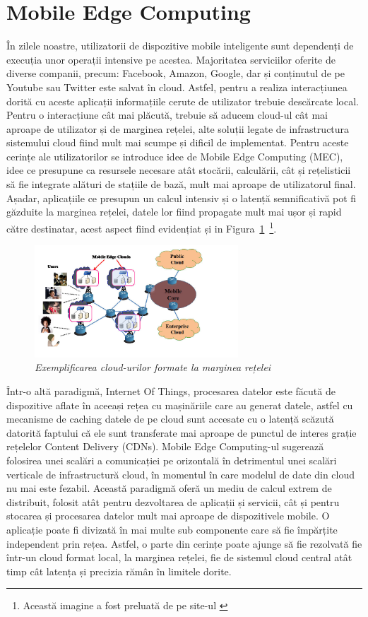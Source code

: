 \documentclass[12pt,a4paper]{report}
\begin{document}
\section{Mobile Edge Computing}
În zilele noastre, utilizatorii de dispozitive mobile inteligente sunt dependenți de execuția unor operații intensive pe acestea. Majoritatea serviciilor oferite de diverse companii, precum: Facebook, Amazon, Google, dar și conținutul de pe Youtube sau Twitter este salvat în cloud. Astfel, pentru a realiza interacțiunea dorită cu aceste aplicații informațiile cerute de utilizator trebuie descărcate local. Pentru o interacțiune cât mai plăcută, trebuie să aducem cloud-ul cât mai aproape de utilizator și de marginea rețelei, alte soluții legate de infrastructura sistemului cloud fiind mult mai scumpe și dificil de implementat. Pentru aceste cerințe ale utilizatorilor se introduce idee de Mobile Edge Computing (MEC), idee ce presupune ca resursele necesare atât stocării, calculării, cât și rețelisticii să fie integrate alături de stațiile de bază, mult mai aproape de utilizatorul final. Așadar, aplicațiile ce presupun un calcul intensiv și o latență semnificativă pot fi găzduite la marginea rețelei, datele lor fiind propagate mult mai ușor și rapid către destinatar, acest aspect fiind evidențiat și in Figura~\ref{fig:pic0}~\footnote{Această imagine a fost preluată de pe site-ul \cite{MECPicture} }.
\begin{figure}[th]
\centering
\includegraphics[width=3in]{pics/mobile-edge-computing.jpg}
  \caption{\emph{Exemplificarea cloud-urilor formate la marginea rețelei}}
  \label{fig:pic0}
\end{figure}

Într-o altă paradigmă, Internet Of Things, procesarea datelor este făcută de dispozitive aflate în aceeași rețea cu mașinăriile care au generat datele, astfel cu mecanisme de caching datele de pe cloud sunt accesate cu o latență scăzută datorită faptului că ele sunt transferate mai aproape de punctul de interes grație rețelelor Content Delivery (CDNs). Mobile Edge Computing-ul\cite{MecSurvey} sugerează folosirea unei scalări a comunicației pe orizontală în detrimentul unei scalări verticale de infrastructură cloud, în momentul în care modelul de date din cloud nu mai este fezabil. Această paradigmă oferă un mediu de calcul extrem de distribuit, folosit atât pentru dezvoltarea de aplicații și servicii, cât și pentru stocarea și procesarea datelor mult mai aproape de dispozitivele mobile. O aplicație poate fi divizată în mai multe sub componente care să fie împărțite independent prin rețea. Astfel, o parte din cerințe poate ajunge să fie rezolvată fie într-un cloud format local, la marginea rețelei, fie de sistemul cloud central atât timp cât latența și precizia rămân în limitele dorite.
\end{document}
